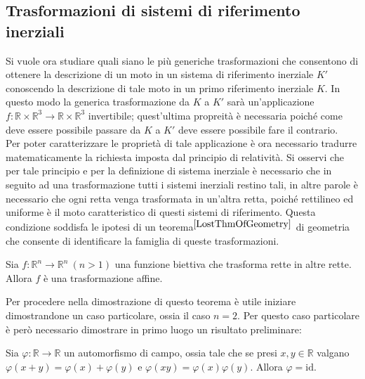 \subsection{Trasformazioni di sistemi di riferimento inerziali}
Si vuole ora studiare quali siano le più generiche trasformazioni che consentono di ottenere la descrizione di un moto in un sistema di riferimento inerziale $K'$ conoscendo la descrizione di tale moto in un primo riferimento inerziale $K$. In questo modo la generica trasformazione da $K$ a $K'$ sarà un'applicazione $f:\mathbb{R}\times \mathbb{R}^3\rightarrow\mathbb{R}\times \mathbb{R}^3$ invertibile; quest'ultima propreità è necessaria poiché come deve essere possibile passare da $K$ a $K'$ deve essere possibile fare il contrario.\\

Per poter caratterizzare le proprietà di tale applicazione è ora necessario tradurre matematicamente la richiesta imposta dal principio di relatività. Si osservi che per tale principio e per la definizione di sistema inerziale è necessario che in seguito ad una trasformazione tutti i sistemi inerziali restino tali, in altre parole è necessario che ogni retta venga trasformata in un'altra retta, poiché rettilineo ed uniforme è il moto caratteristico di questi sistemi di riferimento. Questa condizione soddisfa le ipotesi di un teorema$^{\cite{LostThmOfGeometry}}$ di geometria che consente di identificare la famiglia di queste trasformazioni.

\begin{thm}
Sia $f:\mathbb{R}^n\rightarrow\mathbb{R}^n\ (n>1)$ una funzione biettiva che trasforma rette in altre rette. Allora $f$ è una trasformazione affine. 
\label{thm:LinGenMain}
\end{thm}
Per procedere nella dimostrazione di questo teorema è utile iniziare dimostrandone un caso particolare, ossia il caso $n=2$. Per questo caso particolare è però necessario dimostrare in primo luogo un risultato preliminare:\\

\begin{prop}
	Sia $\varphi:\mathbb{R}\rightarrow\mathbb{R}$ un automorfismo di campo, ossia tale che se presi $x,y\in \mathbb{R}$ valgano $\varphi(x+y)=\varphi(x)+\varphi(y)$ e $\varphi(xy)=\varphi(x)\varphi(y)$.
	Allora $\varphi=\text{id}$.
\end{prop}	

